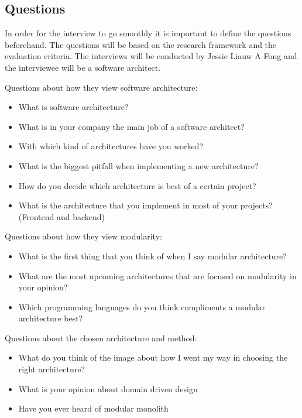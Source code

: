 \subsection{Questions}
\label{sec:Interviews}

In order for the interview to go smoothly it is important to define the questions beforehand. The questions will be based on the research framework and the evaluation criteria. The interviews will be conducted by Jessie Liauw A Fong and the interviewee will be a software architect.

Questions about how they view software architecture:
\begin{itemize}
  \item What is software architecture?
  \item What is in your company the main job of a software architect?
  \item With which kind of architectures have you worked?
  \item What is the biggest pitfall when implementing a new architecture?
  \item How do you decide which architecture is best of a certain project?
  \item What is the architecture that you implement in most of your projects? (Frontend and backend)
\end{itemize}

Questions about how they view modularity:
\begin{itemize}
  \item What is the first thing that you think of when I say modular architecture?
  \item What are the most upcoming architectures that are focused on modularity in your opinion?
  \item Which programming languages do you think compliments a modular architecture best?
\end{itemize}

Questions about the chosen architecture and method:
\begin{itemize}
  \item What do you think of the image about how I went my way in choosing the right architecture?
  \item What is your opinion about domain driven design
  \item Have you ever heard of modular monolith
\end{itemize}


